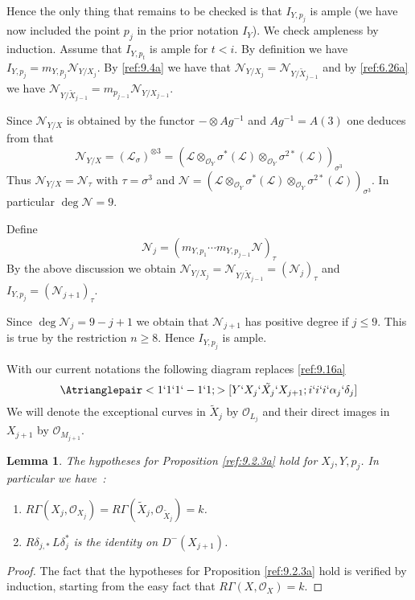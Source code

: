 \documentclass{amsproc}
\def\Lscr{{\mathcal L}}
\def\Nscr{{\mathcal N}}
\def\Oscr{{\mathcal O}}
\newtheorem{lemmas}{Lemma}[subsection]
\theoremstyle{definition}
\theoremstyle{remark}
\numberwithin{equation}{section}
\numberwithin{table}{section}
\numberwithin{figure}{section}
\begin{document}
Hence the only thing that remains to be checked is that $I_{Y,p_j}$ is
ample (we have now included the point $p_j$ in the prior notation
$I_Y$). We check ampleness by induction. Assume that $I_{Y,p_{t}}$ is
ample for $t<i$.  By definition we have $I_{Y,p_j}=m_{Y,p_j}
\Nscr_{Y/X_j}$.  By \eqref{ref:9.4a} we have that
$\Nscr_{Y/X_j}=\Nscr_{Y/\tilde{X}_{j-1}}$ and by \eqref{ref:6.26a} we
have $\Nscr_{Y/\tilde{X}_{j-1}}=m_{p_{j-1}} \Nscr_{Y/X_{j-1}}$.


Since $\Nscr_{Y/X}$ is obtained by the functor $-\otimes Ag^{-1}$ and
$Ag^{-1}=A(3)$  one  deduces from \cite{AVdB} that
\[
\Nscr_{Y/X}=(\Lscr_\sigma)^{\otimes 3}
=(\Lscr\otimes_{\Oscr_Y} \sigma^\ast(\Lscr)\otimes_{\Oscr_Y}
\sigma^{2\ast}(\Lscr))_{\sigma^3}
\]
Thus $\Nscr_{Y/X}=\Nscr_\tau$ with $\tau=\sigma^3$ and
$\Nscr=(\Lscr\otimes_{\Oscr_Y} \sigma^\ast(\Lscr)\otimes_{\Oscr_Y}
\sigma^{2\ast}(\Lscr))_{\sigma^3}$. In particular $\deg\Nscr=9$.

Define
\begin{equation}
\label{ref:11.1b}
\Nscr_j=(m_{Y,p_1}\cdots
m_{Y,p_{j-1}}\Nscr)_\tau
\end{equation}
By the above discussion we obtain
$\Nscr_{Y/X_{j}}=\Nscr_{Y/\tilde{X}_{j-1}}=(\Nscr_j)_\tau$ and
$I_{Y,p_j}=(\Nscr_{j+1})_\tau$.

Since $\deg\Nscr_{j}=9-j+1$ we obtain that $\Nscr_{j+1}$ has positive
degree if $j\le 9$. This is true by the restriction $n\ge 8$. Hence
$I_{Y,p_j}$ is ample.

With our current notations the following diagram replaces 
\eqref{ref:9.16a}
\begin{equation}
\label{ref:11.2a}
\Atrianglepair<1`1`1`-1`1;>[Y`X_j`\tilde{X_j}`X_{j+1};i`i`i`\alpha_j`\delta_j]
\end{equation}
We will denote the exceptional curves in $\tilde{X}_j$  by $\Oscr_{L_j}$ and
their direct images in $X_{j+1}$ by $\Oscr_{M_{j+1}}$.
\begin{lemmas}
\label{ref:11.1.1a}
The hypotheses for Proposition
  \ref{ref:9.2.3a} hold for $X_j,Y,p_j$. In particular we have~:
\begin{enumerate}
\item
  $R\Gamma(X_j,\Oscr_{X_j})=R\Gamma(\tilde{X}_j,\Oscr_{\tilde{X}_{j}})=k$. 
\item $R\delta_{{j},\ast} \,L\delta^\ast_{j}$ is the identity on
  $D^{-}(X_{{j}+1})$.
\end{enumerate}
\end{lemmas}
\begin{proof} The fact that  the hypotheses for Proposition
  \ref{ref:9.2.3a} hold is  verified by induction, starting from the
  easy fact that
  $R\Gamma(X,\Oscr_X)=k$.
\end{proof}
\end{document}
